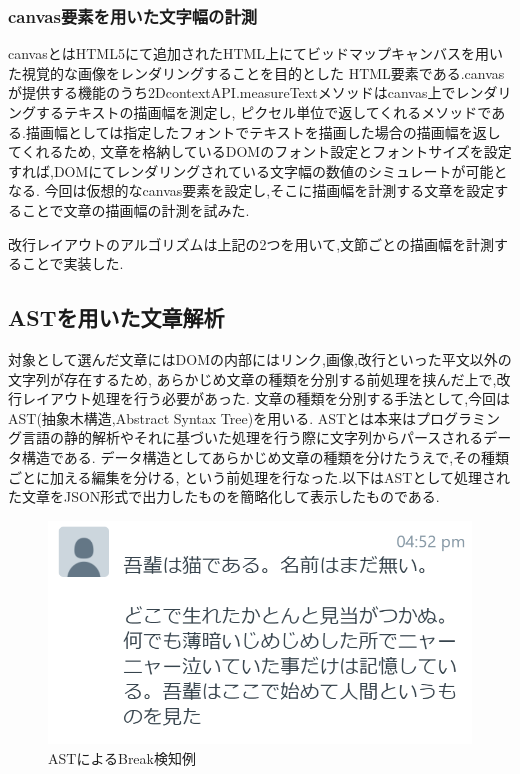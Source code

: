 \subsubsection{canvas要素を用いた文字幅の計測}
canvasとはHTML5にて追加されたHTML上にてビッドマップキャンバスを用いた視覚的な画像をレンダリングすることを目的とした
HTML要素である.canvasが提供する機能のうち2DcontextAPI.measureTextメソッドはcanvas上でレンダリングするテキストの描画幅を測定し,
ピクセル単位で返してくれるメソッドである.描画幅としては指定したフォントでテキストを描画した場合の描画幅を返してくれるため,
文章を格納しているDOMのフォント設定とフォントサイズを設定すれば,DOMにてレンダリングされている文字幅の数値のシミュレートが可能となる.
今回は仮想的なcanvas要素を設定し,そこに描画幅を計測する文章を設定することで文章の描画幅の計測を試みた.

改行レイアウトのアルゴリズムは上記の2つを用いて,文節ごとの描画幅を計測することで実装した.

\subsection{ASTを用いた文章解析}
対象として選んだ文章にはDOMの内部にはリンク,画像,改行といった平文以外の文字列が存在するため,
あらかじめ文章の種類を分別する前処理を挟んだ上で,改行レイアウト処理を行う必要があった.
文章の種類を分別する手法として,今回はAST(抽象木構造,Abstract Syntax Tree)を用いる.
ASTとは本来はプログラミング言語の静的解析やそれに基づいた処理を行う際に文字列からパースされるデータ構造である.
データ構造としてあらかじめ文章の種類を分けたうえで,その種類ごとに加える編集を分ける,
という前処理を行なった.以下はASTとして処理された文章をJSON形式で出力したものを簡略化して表示したものである.

\newpage
\begin{figure}[H]
    \centering
    \label{fig:ASTofBreak}
    \includegraphics[width=0.6\columnwidth]{image/03/breakAST.png}
	\caption[ASTによるBreak検知例]{ASTによるBreak検知例}
\end{figure}

